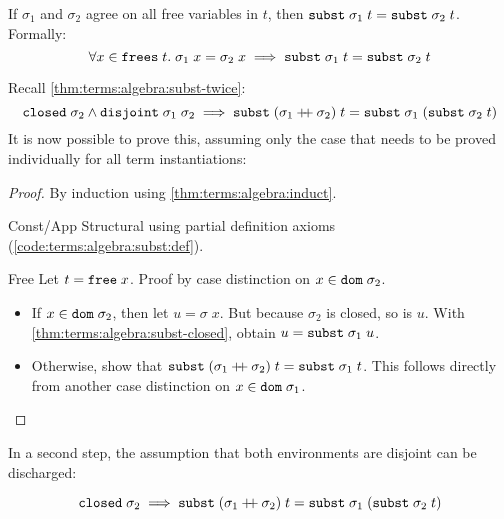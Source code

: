 \begin{corollary}\label{thm:terms:algebra:subst-cong}
  If $\sigma_1$ and $\sigma_2$ agree on all free variables in $t$, then $\texttt{\textup{subst}}\;\sigma_1\;t = \texttt{\textup{subst}}\;\sigma_2\;t$.
  Formally:
  \[
    \forall x \in \texttt{\textup{frees}}\;t.\;\sigma_1\;x = \sigma_2\;x \implies \texttt{\textup{subst}}\;\sigma_1\;t = \texttt{\textup{subst}}\;\sigma_2\;t
  \]
\end{corollary}

\noindent
Recall \cref{thm:terms:algebra:subst-twice}:
\[
  \texttt{\textup{closed}}\;\sigma_2 \wedge \texttt{\textup{disjoint}}\;\sigma_1\;\sigma_2 \implies \texttt{\textup{subst}}\;(\sigma_1 \mathbin{+\!\!+} \sigma_2)\;t = \texttt{\textup{subst}}\;\sigma_1\;(\texttt{\textup{subst}}\;\sigma_2\;t)
\]
It is now possible to prove this, assuming only the  case that needs to be proved individually for all term instantiations:

\begin{proof}
  By induction using \cref{thm:terms:algebra:induct}.
  \begin{induction}
    \item[Const/App] Structural using partial definition axioms (\cref{code:terms:algebra:subst:def}).
    \item[Free]
      Let $t = \texttt{\textup{free}}\;x$.
      Proof by case distinction on $x \in \texttt{\textup{dom}}\;\sigma_2$.
      \begin{itemize}
        \item
          If $x \in \texttt{\textup{dom}}\;\sigma_2$, then let $u = \sigma\;x$.
          But because $\sigma_2$ is closed, so is $u$.
          With \cref{thm:terms:algebra:subst-closed}, obtain $u = \texttt{\textup{subst}}\;\sigma_1\;u$.
        \item
          Otherwise, show that $\texttt{\textup{subst}}\;(\sigma_1 \mathbin{+\!\!+} \sigma_2)\;t = \texttt{\textup{subst}}\;\sigma_1\;t$.
          This follows directly from another case distinction on $x \in \texttt{\textup{dom}}\;\sigma_1$. \qedhere
      \end{itemize}
  \end{induction}
\end{proof}

\noindent
In a second step, the assumption that both environments are disjoint can be discharged:

\begin{lemma}\label{thm:terms:algebra:subst-indep}
  \[ \texttt{\textup{closed}}\;\sigma_2 \implies \texttt{\textup{subst}}\;(\sigma_1 \mathbin{+\!\!+} \sigma_2)\;t = \texttt{\textup{subst}}\;\sigma_1\;(\texttt{\textup{subst}}\;\sigma_2\;t) \]
\end{lemma}

